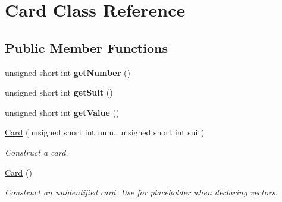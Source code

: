 \hypertarget{classCard}{}\section{Card Class Reference}
\label{classCard}
\subsection*{Public Member Functions}
\begin{DoxyCompactItemize}
\item 
\mbox{\label{classCard_af72b2c2df9b82f3e4c97808668a8563d}} 
unsigned short int {\bfseries get\+Number} ()
\item 
\mbox{\label{classCard_a69cd2cb8997a05d806723e47ec53c93e}} 
unsigned short int {\bfseries get\+Suit} ()
\item 
\mbox{\label{classCard_a6213417106cb3d3d5a824b81d2d9c1c6}} 
unsigned short int {\bfseries get\+Value} ()
\item 
\hyperlink{classCard_ab1406a01ecfea3110f8e6188e11c4863}{Card} (unsigned short int num, unsigned short int suit)
\begin{DoxyCompactList}\small\item\em Construct a card. \end{DoxyCompactList}\item 
\mbox{\label{classCard_a783f5854cbe8c183ee3d4414c01472c0}} 
\hyperlink{classCard_a783f5854cbe8c183ee3d4414c01472c0}{Card} ()
\begin{DoxyCompactList}\small\item\em Construct an unidentified card. Use for placeholder when declaring vectors. \end{DoxyCompactList}\end{DoxyCompactItemize}
